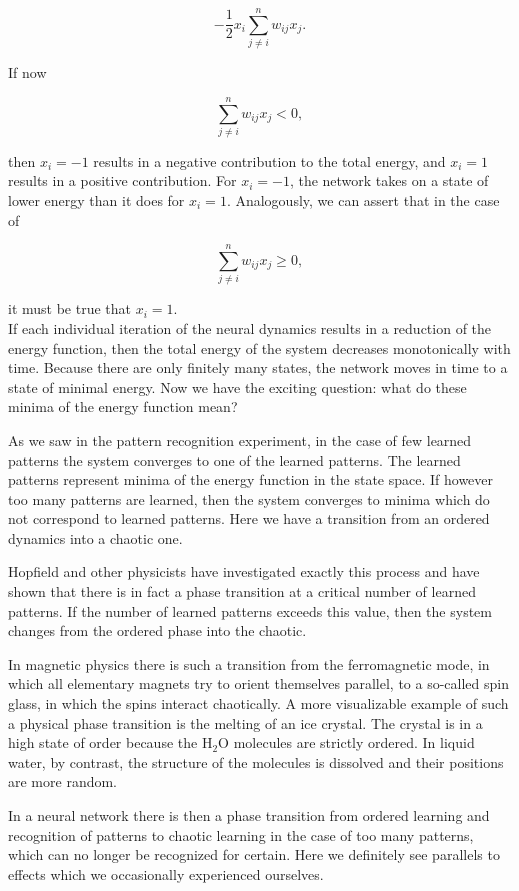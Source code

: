 \documentclass[10pt]{article}
\begin{document}
$$
-\frac{1}{2} x_{i} \sum_{j \neq i}^{n} w_{i j} x_{j} .
$$

If now

$$
\sum_{j \neq i}^{n} w_{i j} x_{j}<0,
$$

then $x_{i}=-1$ results in a negative contribution to the total energy, and $x_{i}=1$ results in a positive contribution. For $x_{i}=-1$, the network takes on a state of lower energy than it does for $x_{i}=1$. Analogously, we can assert that in the case of

$$
\sum_{j \neq i}^{n} w_{i j} x_{j} \geq 0,
$$

it must be true that $x_{i}=1$.\\
If each individual iteration of the neural dynamics results in a reduction of the energy function, then the total energy of the system decreases monotonically with time. Because there are only finitely many states, the network moves in time to a state of minimal energy. Now we have the exciting question: what do these minima of the energy function mean?

As we saw in the pattern recognition experiment, in the case of few learned patterns the system converges to one of the learned patterns. The learned patterns represent minima of the energy function in the state space. If however too many patterns are learned, then the system converges to minima which do not correspond to learned patterns. Here we have a transition from an ordered dynamics into a chaotic one.

Hopfield and other physicists have investigated exactly this process and have shown that there is in fact a phase transition at a critical number of learned patterns. If the number of learned patterns exceeds this value, then the system changes from the ordered phase into the chaotic.

In magnetic physics there is such a transition from the ferromagnetic mode, in which all elementary magnets try to orient themselves parallel, to a so-called spin glass, in which the spins interact chaotically. A more visualizable example of such a physical phase transition is the melting of an ice crystal. The crystal is in a high state of order because the $\mathrm{H}_{2} \mathrm{O}$ molecules are strictly ordered. In liquid water, by contrast, the structure of the molecules is dissolved and their positions are more random.

In a neural network there is then a phase transition from ordered learning and recognition of patterns to chaotic learning in the case of too many patterns, which can no longer be recognized for certain. Here we definitely see parallels to effects which we occasionally experienced ourselves.
\end{document}
